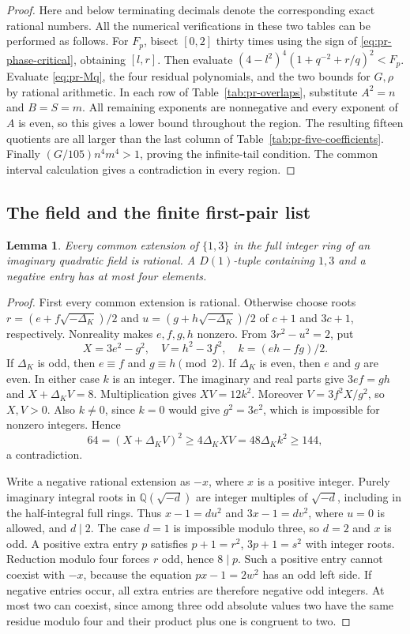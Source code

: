 \documentclass[12pt]{article}
\newtheorem{lemma}[theorem]{Lemma}
\numberwithin{equation}{section}
\begin{document}
\begin{proof}
Here and below terminating decimals denote the corresponding exact
rational numbers. All the numerical verifications in these two tables
can be performed as follows. For \(F_p\), bisect \([0,2]\) thirty times
using the sign of \eqref{eq:pr-phase-critical}, obtaining \([l,r]\).
Then evaluate
\((4-l^2)^4(1+q^{-2}+r/q)^2<F_p\).
Evaluate \eqref{eq:pr-Mq}, the four residual polynomials, and the two
bounds for \(G,\rho\) by rational arithmetic. In each row of
Table~\ref{tab:pr-overlaps}, substitute \(A^2=n\) and \(B=S=m\).
All remaining exponents are nonnegative and every exponent of \(A\)
is even, so this gives a lower bound throughout the region. The
resulting fifteen quotients are all larger than the last column of
Table~\ref{tab:pr-five-coefficients}. Finally
\((G/105)n^4m^4>1\), proving the infinite-tail condition. The common
interval calculation gives a contradiction in every region.
\end{proof}

\subsection{The field and the finite first-pair list}

\begin{lemma}\label{lem:pr-one-three}
Every common extension of $\{1,3\}$ in the full integer ring of an
imaginary quadratic field is rational. A $D(1)$-tuple containing
$1,3$ and a negative entry has at most four elements.
\end{lemma}
\begin{proof}
First every common extension is rational. Otherwise choose roots
\(r=(e+f\sqrt{-\Delta_K})/2\) and
\(u=(g+h\sqrt{-\Delta_K})/2\) of \(c+1\) and \(3c+1\), respectively.
Nonreality makes \(e,f,g,h\) nonzero. From \(3r^2-u^2=2\), put
\[
 X=3e^2-g^2,\quad V=h^2-3f^2,\quad k=(eh-fg)/2.
\]
If $\Delta_K$ is odd, then $e\equiv f$ and $g\equiv h\pmod2$.
If $\Delta_K$ is even, then $e$ and $g$ are even.
In either case $k$ is an integer. The imaginary and real parts
give $3ef=gh$ and $X+\Delta_K V=8$. Multiplication gives
\(XV=12k^2\). Moreover $V=3f^2X/g^2$, so $X,V>0$. Also $k\ne0$, since $k=0$ would give $g^2=3e^2$, which is impossible for nonzero integers. Hence
\[
 64=(X+\Delta_K V)^2\ge4\Delta_K XV=48\Delta_K k^2\ge144,
\]
a contradiction.

Write a negative rational extension as \(-x\), where \(x\) is a
positive integer. Purely imaginary integral roots in
\(\mathbb Q(\sqrt{-d})\) are integer multiples of \(\sqrt{-d}\),
including in the half-integral full rings. Thus
\(x-1=du^2\) and \(3x-1=dv^2\), where \(u=0\) is allowed,
and \(d\mid2\).
The case \(d=1\) is impossible modulo three, so \(d=2\) and \(x\)
is odd. A positive extra entry \(p\) satisfies
\(p+1=r^2\), \(3p+1=s^2\) with integer roots. Reduction modulo four
forces \(r\) odd, hence \(8\mid p\). Such a positive entry cannot coexist with $-x$, because the equation $px-1=2w^2$ has an odd left side. If negative entries occur, all extra entries are therefore
negative odd integers. At most two can coexist, since among three
odd absolute values two have the same residue modulo four and their
product plus one is congruent to two.
\end{proof}
\end{document}
